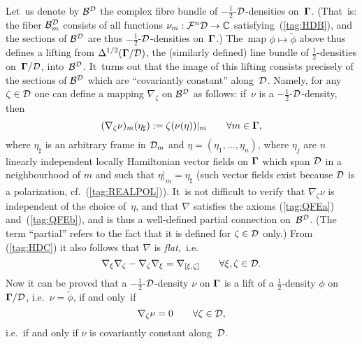 \documentclass[12pt]{amsart}
\numberwithin{equation}{section}
\theoremstyle{remark}
\newcommand\Omg{{\bigam}}   %
\newcommand\FF{\Cal F}
\newcommand\DD{{\Cal D}}
\newcommand\MD{{\Omg/\DD}}
\newcommand\mhD{$-\tfrac12$-$\DD$}
\newcommand\BB{\Cal B}
\newcommand{\CC}{\C}
\newcommand{\bigam}{\mbox{\boldmath $\Gamma$}}
\newcommand{\C}{\mathbb C}
\begin{document}
Let~us denote by $\BB^\DD$ the complex fibre bundle of \mhD-densities
on~$\Omg$. (That~is: the fiber $\BB_m^\DD$ consists of all functions
$\nu_m:\FF^n\DD\to\CC$ satisfying~(\ref{tag:HDB}), and the sections of
$\BB^\DD$ are thus \mhD-densities on~$\Omg$.) The~map $\phi\mapsto\tilde\phi$
above thus defines a lifting from $\Delta^{1/2}(\MD)$, the (similarly defined)
line bundle of $\tfrac12$-densities on~$\MD$, into~$\BB^\DD$. It~turns out that
the image of this lifting consists precisely of the sections of $\BB^\DD$ which
are ``covariantly constant'' along~$\DD$. Namely, for any $\zeta\in\DD$ one can
define a mapping $\nabla_\zeta$ on $\BB^\DD$ as follows: if~$\nu$ is a
\mhD-density, then
\begin{equation}  (\nabla_\zeta \nu)_m (\eta_\sharp) := \zeta(\nu(\eta))|_m
\qquad \forall m\in \Omg,   \label{tag:HDC}  \end{equation}
where $\eta_\sharp$ is an arbitrary frame in $\DD_m$ and
$\eta=(\eta_1,\dots,\eta_n)$, where $\eta_j$ are $n$ linearly independent
locally Hamiltonian vector fields on $\Omg$ which span $\DD$ in a neighbourhood
of $m$ and such that $\eta|_m=\eta_\sharp$ (such vector fields exist because
$\DD$ is a polarization, cf.~(\ref{tag:REALPOL})). It~is not difficult to
verify that $\nabla_\zeta\nu$ is independent of the choice of~$\eta$, and that
$\nabla$ satisfies the axioms (\ref{tag:QFEa}) and~(\ref{tag:QFEb}), and is
thus a well-defined partial connection on~$\BB^\DD$. (The term ``partial''
refers to the fact that it is defined for $\zeta\in\DD$ only.)
From (\ref{tag:HDC}) it also follows that $\nabla$ is {\it flat,\/}~i.e.
$$ \nabla_\xi\nabla_\zeta-\nabla_\zeta\nabla_\xi=\nabla_{[\xi,\zeta]}
\qquad \forall \xi,\zeta\in\DD.  $$
Now it can be proved that a \mhD-density $\nu$ on $\Omg$ is a lift of a
$\frac12$-density $\phi$ on $\MD$, i.e.~$\nu=\tilde\phi$, if and only~if
$$ \nabla_\zeta\nu =0 \qquad\forall \zeta\in\DD,  $$
i.e.~if and only if $\nu$ is covariantly constant along~$\DD$.
\end{document}
